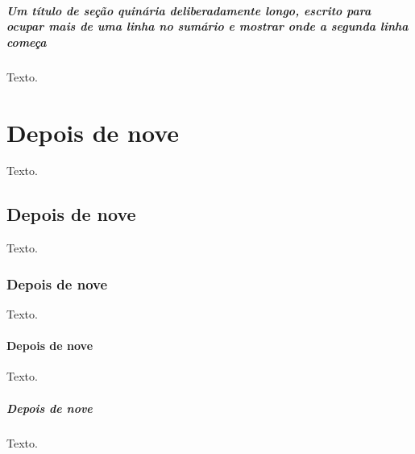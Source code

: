 \documentclass[dsc]{ufrj}
\begin{document}
  \paragraph{Um título de seção quinária deliberadamente longo, escrito para
    ocupar mais de uma linha no sumário e mostrar onde a segunda linha começa}
    Texto.
  \setcounter{chapter}{9}
  \chapter{Depois de nove}
    Texto.
  \setcounter{section}{9}
  \section{Depois de nove}
    Texto.
  \setcounter{subsection}{9}
  \subsection{Depois de nove}
    Texto.
  \setcounter{subsubsection}{9}
  \subsubsection{Depois de nove}
    Texto.
  \setcounter{paragraph}{9}
  \paragraph{Depois de nove}
    Texto.
\end{document}
